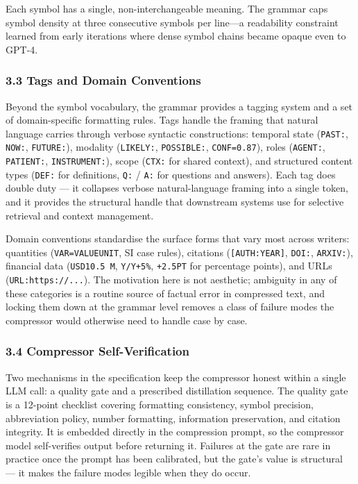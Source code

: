 \documentclass[
]{article}
\begin{document}
Each symbol has a single, non-interchangeable meaning. The grammar caps
symbol density at three consecutive symbols per line---a readability
constraint learned from early iterations where dense symbol chains
became opaque even to GPT-4.

\subsubsection{3.3 Tags and Domain
Conventions}\label{tags-and-domain-conventions}

Beyond the symbol vocabulary, the grammar provides a tagging system and
a set of domain-specific formatting rules. Tags handle the framing that
natural language carries through verbose syntactic constructions:
temporal state (\texttt{PAST:}, \texttt{NOW:}, \texttt{FUTURE:}),
modality (\texttt{LIKELY:}, \texttt{POSSIBLE:}, \texttt{CONF=0.87}),
roles (\texttt{AGENT:}, \texttt{PATIENT:}, \texttt{INSTRUMENT:}), scope
(\texttt{CTX:} for shared context), and structured content types
(\texttt{DEF:} for definitions, \texttt{Q:} / \texttt{A:} for questions
and answers). Each tag does double duty --- it collapses verbose
natural-language framing into a single token, and it provides the
structural handle that downstream systems use for selective retrieval
and context management.

Domain conventions standardise the surface forms that vary most across
writers: quantities (\texttt{VAR=VALUEUNIT}, SI case rules), citations
(\texttt{{[}AUTH:YEAR{]}}, \texttt{DOI:}, \texttt{ARXIV:}), financial
data (\texttt{USD10.5\ M}, \texttt{Y/Y+5\%}, \texttt{+2.5PT} for
percentage points), and URLs (\texttt{URL:https://...}). The motivation
here is not aesthetic; ambiguity in any of these categories is a routine
source of factual error in compressed text, and locking them down at the
grammar level removes a class of failure modes the compressor would
otherwise need to handle case by case.

\subsubsection{3.4 Compressor
Self-Verification}\label{compressor-self-verification}

Two mechanisms in the specification keep the compressor honest within a
single LLM call: a quality gate and a prescribed distillation sequence.
The quality gate is a 12-point checklist covering formatting
consistency, symbol precision, abbreviation policy, number formatting,
information preservation, and citation integrity. It is embedded
directly in the compression prompt, so the compressor model
self-verifies output before returning it. Failures at the gate are rare
in practice once the prompt has been calibrated, but the gate's value is
structural --- it makes the failure modes legible when they do occur.
\end{document}
